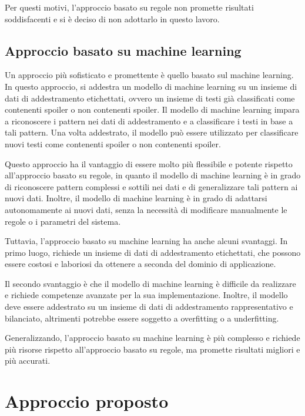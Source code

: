 Per questi motivi, l'approccio basato su regole non
promette risultati soddisfacenti e si è deciso di non
adottarlo in questo lavoro.

\subsection{Approccio basato su machine learning}
\label{subsec:approccio-ml}

Un approccio più sofisticato e promettente è quello basato
sul machine learning.
In questo approccio, si addestra un modello di machine
learning su un insieme di dati di addestramento
etichettati, ovvero un insieme di testi già classificati
come contenenti spoiler o non contenenti spoiler.
Il modello di machine learning impara a riconoscere i
pattern nei dati di addestramento e a classificare i testi
in base a tali pattern.
Una volta addestrato, il modello può essere utilizzato per
classificare nuovi testi come contenenti spoiler o non
contenenti spoiler.

Questo approccio ha il vantaggio di essere molto più
flessibile e potente rispetto all'approccio basato su
regole, in quanto il modello di machine learning è in grado
di riconoscere pattern complessi e sottili nei dati e di
generalizzare tali pattern ai nuovi dati.
Inoltre, il modello di machine learning è in grado di
adattarsi autonomamente ai nuovi dati, senza la necessità
di modificare manualmente le regole o i parametri del
sistema.

Tuttavia, l'approccio basato su machine learning ha anche
alcuni svantaggi.
In primo luogo, richiede un insieme di dati di
addestramento etichettati, che possono essere costosi e
laboriosi da ottenere a seconda del dominio di
applicazione.

Il secondo svantaggio è che il modello di machine learning
è difficile da realizzare e richiede competenze avanzate
per la sua implementazione.
Inoltre, il modello deve essere addestrato su un insieme di
dati di addestramento rappresentativo e bilanciato,
altrimenti potrebbe essere soggetto a overfitting o a
underfitting.

Generalizzando, l'approccio basato su machine learning è
più complesso e richiede più risorse rispetto all'approccio
basato su regole, ma promette risultati migliori e più
accurati.

\section{Approccio proposto}
\label{sec:approccio-proposto}

